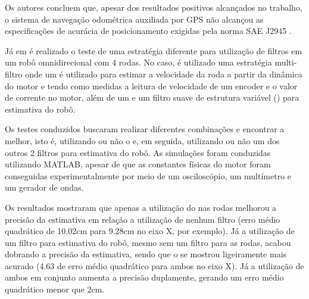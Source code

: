 \documentclass[acronym, symbols, table]{fei}
\begin{document}
	Os autores concluem que, apesar dos resultados positivos alcançados no trabalho, o sistema de navegação odométrica auxiliada por GPS não alcançou as especificações de acurácia de posicionamento exigidas pela norma SAE J2945 \cite{sae2016board}.
	
	Já em \textcite{9233826} é realizado o teste de uma estratégia diferente para utilização de filtros em um robô omnidirecional com 4 rodas. No caso, é utilizado uma estratégia multi-filtro onde um  é utilizado para estimar a velocidade da roda a partir da dinâmica do motor e tendo como medidas a leitura de velocidade de um encoder e o valor de corrente no motor, além de um  e um filtro suave de estrutura variável () para estimativa do robô.
	
	Os testes conduzidos buscaram realizar diferentes combinações e encontrar a melhor, isto é, utilizando ou não o  e, em seguida, utilizando ou não um dos outros 2 filtros para estimativa do robô. As simulações foram conduzidas utilizando MATLAB, apesar de que as constantes físicas do motor foram conseguidas experimentalmente por meio de um osciloscópio, um multímetro e um gerador de ondas.
	
	Os resultados mostraram que apenas a utilização do  nas rodas melhorou a precisão da estimativa em relação a utilização de nenhum filtro (erro médio quadrático de 10.02cm para 9.28cm no eixo X, por exemplo). Já a utilização de um filtro para estimativa do robô, mesmo sem um filtro para as rodas, acabou dobrando a precisão da estimativa, sendo que o  se mostrou ligeiramente mais acurado (4.63 de erro médio quadrático para ambos no eixo X). Já a utilização de ambos em conjunto aumenta a precisão duplamente, gerando um erro médio quadrático menor que 2cm.
	
\end{document}
